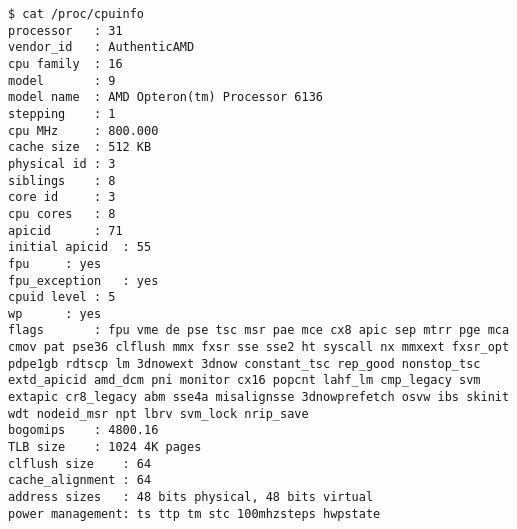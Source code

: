 \documentclass{article}
\begin{document}
\begin{lstlisting}
$ cat /proc/cpuinfo
processor   : 31
vendor_id   : AuthenticAMD
cpu family  : 16
model       : 9
model name  : AMD Opteron(tm) Processor 6136
stepping    : 1
cpu MHz     : 800.000
cache size  : 512 KB
physical id : 3
siblings    : 8
core id     : 3
cpu cores   : 8
apicid      : 71
initial apicid  : 55
fpu     : yes
fpu_exception   : yes
cpuid level : 5
wp      : yes
flags       : fpu vme de pse tsc msr pae mce cx8 apic sep mtrr pge mca cmov pat pse36 clflush mmx fxsr sse sse2 ht syscall nx mmxext fxsr_opt pdpe1gb rdtscp lm 3dnowext 3dnow constant_tsc rep_good nonstop_tsc extd_apicid amd_dcm pni monitor cx16 popcnt lahf_lm cmp_legacy svm extapic cr8_legacy abm sse4a misalignsse 3dnowprefetch osvw ibs skinit wdt nodeid_msr npt lbrv svm_lock nrip_save
bogomips    : 4800.16
TLB size    : 1024 4K pages
clflush size    : 64
cache_alignment : 64
address sizes   : 48 bits physical, 48 bits virtual
power management: ts ttp tm stc 100mhzsteps hwpstate
\end{lstlisting}
\end{document}

